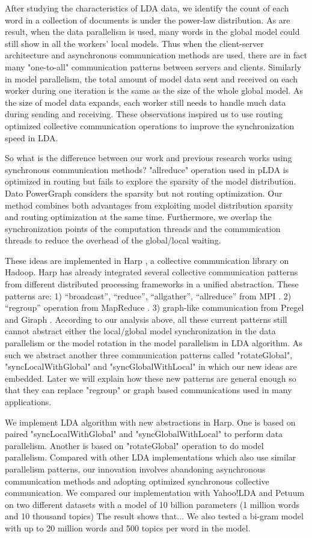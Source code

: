 \documentclass[conference]{IEEEtran}
\begin{document}
After studying the characteristics of LDA data, 
we identify the count of each word in a collection of documents
is under the power-law distribution.
As are result, when the data parallelism is used,
many words in the global model could still show in all the workers' local models.
Thus when the client-server architecture and asynchronous communication methods are used,
there are in fact many "one-to-all" communication patterns between servers and clients.
Similarly in model parallelism, the total amount of model data 
sent and received on each worker during one iteration
is the same as the size of the whole global model.
As the size of model data expands, each worker still needs
to handle much data during sending and receiving.
These observations inspired us to use 
routing optimized collective communication operations
to improve the synchronization speed in LDA.
 
So what is the difference between our work and previous research works
using synchronous communication methods?
"allreduce" operation used in pLDA is optimized in routing
but fails to explore the sparsity of the model distribution. 
Dato PowerGraph considers the sparsity but not routing optimization.
Our method combines both advantages from exploiting model distribution sparsity
and routing optimization at the same time. 
Furthermore, we overlap the synchronization points of the computation threads and the communication threads
to reduce the overhead of the global/local waiting.   

These ideas are implemented in Harp \cite{22}, a collective communication library on Hadoop.
Harp has already integrated several collective communication patterns from
different distributed processing frameworks in a unified abstraction. These patterns are: 
1) ``broadcast'', ``reduce'', ``allgather'', ``allreduce'' from MPI \cite{19}.
2) ``regroup'' operation from MapReduce \cite{23}.
3) graph-like communication from Pregel \cite{24} and Giraph \cite{25}. 
According to our analysis above, all these current patterns still cannot abstract
either the local/global model synchronization in the data parallelism
or the model rotation in the model parallelism in LDA algorithm.
As such we abstract another three communication patterns called "rotateGlobal",
"syncLocalWithGlobal" and "syncGlobalWithLocal" in which our new ideas are embedded.
Later we will explain how these new patterns 
are general enough so that they can replace "regroup"
or graph based communications used in many applications.

We implement LDA algorithm with new abstractions in Harp. 
One is based on paired "syncLocalWithGlobal" and "syncGlobalWithLocal"
to perform data parallelism.
Another is based on "rotateGlobal" operation to do model parallelism.
Compared with other LDA implementations which also use similar parallelism patterns,
our innovation involves abandoning asynchronous communication methods
and adopting optimized synchronous collective communication.
We compared our implementation with Yahoo!LDA and Petuum on two different datasets
with a model of 10 billion parameters
(1 million words and 10 thousand topics)
The result shows that...
We also tested a bi-gram model with up to 20 million words and 500 topics per word in the model.
\end{document}
